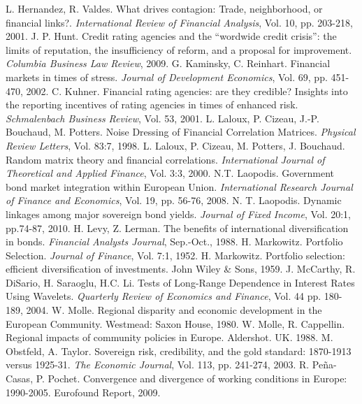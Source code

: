 \documentclass[3p]{elsarticle}
\begin{document}
\begin{thebibliography}
 L. Hernandez, R. Valdes. What drives contagion: Trade, neighborhood, or financial links?. \textit{International Review of Financial Analysis}, Vol. 10, pp. 203-218, 2001.
 J. P. Hunt. Credit rating agencies and the ``wordwide credit crisis'': the limits of reputation, the insufficiency of reform, and a proposal for improvement. \textit{Columbia Business Law Review}, 2009.
 G. Kaminsky, C. Reinhart. Financial markets in times of stress. \textit{Journal of Development Economics}, Vol. 69, pp. 451-470, 2002.
 C. Kuhner. Financial rating agencies: are they credible? Insights into the reporting incentives of rating agencies in times of enhanced risk. \textit{Schmalenbach Business Review}, Vol. 53, 2001.
 L. Laloux, P. Cizeau, J.-P. Bouchaud, M. Potters. Noise Dressing of Financial Correlation Matrices.  \textit{Physical Review Letters}, Vol. 83:7, 1998. 
 L. Laloux, P. Cizeau, M. Potters, J. Bouchaud.  Random matrix theory and financial correlations.  \textit{International Journal of Theoretical and Applied Finance}, Vol. 3:3, 2000.
 N.T. Laopodis. Government bond market integration within European Union. \textit{International Research Journal of Finance and Economics}, Vol. 19, pp. 56-76, 2008.
 N. T. Laopodis. Dynamic linkages among major sovereign bond yields.  \textit{Journal of Fixed Income}, Vol. 20:1, pp.74-87, 2010.
 H. Levy, Z. Lerman. The benefits of international diversification in bonds. \textit{Financial Analysts Journal}, Sep.-Oct., 1988.
 H. Markowitz. Portfolio Selection.  \textit{Journal of Finance}, Vol. 7:1, 1952.
 H. Markowitz.  Portfolio selection: efficient diversification of investments. John Wiley \& Sons, 1959.
 J. McCarthy, R. DiSario, H. Saraoglu, H.C. Li. Tests of Long-Range Dependence in Interest Rates Using Wavelets.  \textit{Quarterly Review of Economics and Finance}, Vol. 44 pp. 180-189, 2004.
 W. Molle.  Regional disparity and economic development in the European Community. Westmead: Saxon House, 1980.
 W. Molle, R. Cappellin. Regional impacts of community policies in Europe. Aldershot. UK. 1988.
 M. Obstfeld, A. Taylor. Sovereign risk, credibility, and the gold standard: 1870-1913 versus 1925-31. \textit{The Economic Journal}, Vol. 113, pp. 241-274, 2003.
 R. Pe\~na-Casas, P. Pochet. Convergence and divergence of working conditions in Europe: 1990-2005. Eurofound Report, 2009.

\end{thebibliography}
\end{document}
